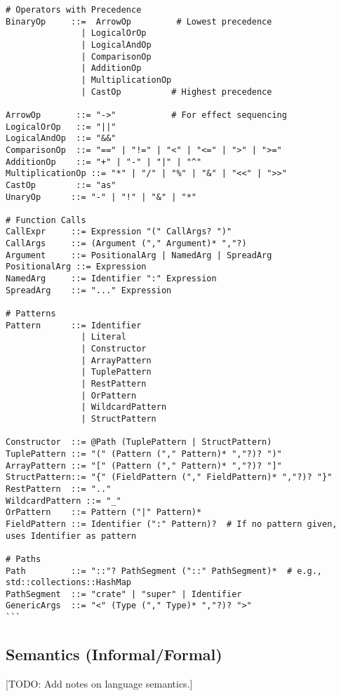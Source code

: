 \begin{verbatim}
# Operators with Precedence
BinaryOp     ::=  ArrowOp         # Lowest precedence
               | LogicalOrOp
               | LogicalAndOp
               | ComparisonOp
               | AdditionOp
               | MultiplicationOp
               | CastOp          # Highest precedence

ArrowOp       ::= "->"           # For effect sequencing
LogicalOrOp   ::= "||"
LogicalAndOp  ::= "&&"
ComparisonOp  ::= "==" | "!=" | "<" | "<=" | ">" | ">="
AdditionOp    ::= "+" | "-" | "|" | "^"
MultiplicationOp ::= "*" | "/" | "%" | "&" | "<<" | ">>"
CastOp        ::= "as"
UnaryOp      ::= "-" | "!" | "&" | "*"

# Function Calls
CallExpr     ::= Expression "(" CallArgs? ")"
CallArgs     ::= (Argument ("," Argument)* ","?)
Argument     ::= PositionalArg | NamedArg | SpreadArg
PositionalArg ::= Expression
NamedArg     ::= Identifier ":" Expression
SpreadArg    ::= "..." Expression

# Patterns
Pattern      ::= Identifier 
               | Literal 
               | Constructor 
               | ArrayPattern 
               | TuplePattern 
               | RestPattern 
               | OrPattern
               | WildcardPattern
               | StructPattern

Constructor  ::= @Path (TuplePattern | StructPattern)
TuplePattern ::= "(" (Pattern ("," Pattern)* ","?)? ")"
ArrayPattern ::= "[" (Pattern ("," Pattern)* ","?)? "]"
StructPattern::= "{" (FieldPattern ("," FieldPattern)* ","?)? "}"
RestPattern  ::= ".."
WildcardPattern ::= "_"
OrPattern    ::= Pattern ("|" Pattern)*
FieldPattern ::= Identifier (":" Pattern)?  # If no pattern given, uses Identifier as pattern

# Paths
Path         ::= "::"? PathSegment ("::" PathSegment)*  # e.g., std::collections::HashMap
PathSegment  ::= "crate" | "super" | Identifier
GenericArgs  ::= "<" (Type ("," Type)* ","?)? ">"
```
\end{verbatim}

\subsection{Semantics (Informal/Formal)} %
[TODO: Add notes on language semantics.]

